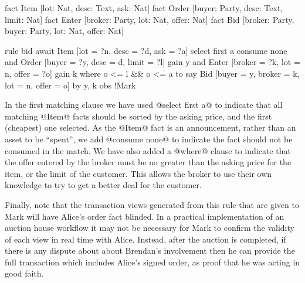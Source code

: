 \begin{small}
\begin{code}
fact Item  [lot: Nat, desc: Text, ask: Nat]
fact Order [buyer:  Party, desc: Text, limit: Nat]
fact Enter [broker: Party, lot: Nat, offer: Nat]
fact Bid  [broker: Party, buyer: Party, lot: Nat, offer: Nat]

  rule  bid
  await Item   [lot = ?n, desc = ?d, ask = ?a]
               select first a   consume none
    and Order  [buyer  = ?y, desc = d, limit = ?l] gain {y}
    and Enter  [broker = ?k, lot  = n, offer = ?o] gain {k}
         where o <= l && o <= a
  to
    say Bid    [buyer = y, broker = k, lot = n, offer = o]
     by {y, k} obs {!Mark}
\end{code}
\end{small}

In the first matching clause we have used @select first a@ to indicate that all matching @Item@ facts should be sorted by the asking price, and the first (cheapest) one selected. As the @Item@ fact is an announcement, rather than an asset to be ``spent'', we add @consume none@ to indicate the fact should not be consumed in the match. We have also added a @where@ clause to indicate that the offer entered by the broker must be no greater than the asking price for the item, or the limit of the customer. This allows the broker to use their own knowledge to try to get a better deal for the customer.

Finally, note that the transaction views generated from this rule that are given to Mark will have Alice's order fact blinded. In a practical implementation of an auction house workflow it may not be necessary for Mark to confirm the validity of each view in real time with Alice. Instead, after the auction is completed, if there is any dispute about about Brendan's involvement then he can provide the full transaction which includes Alice's signed order, as proof that he was acting in good faith.



